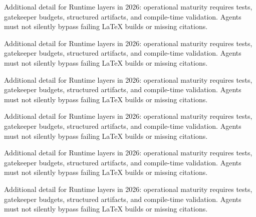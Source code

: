 Additional detail for Runtime layers in 2026: operational maturity requires tests, gatekeeper budgets, structured artifacts, and compile-time validation. Agents must not silently bypass failing LaTeX builds or missing citations. \cite{crewai2024} \cite{langgraph2024} \cite{mcp2024}

Additional detail for Runtime layers in 2026: operational maturity requires tests, gatekeeper budgets, structured artifacts, and compile-time validation. Agents must not silently bypass failing LaTeX builds or missing citations. \cite{crewai2024} \cite{langgraph2024} \cite{mcp2024}

Additional detail for Runtime layers in 2026: operational maturity requires tests, gatekeeper budgets, structured artifacts, and compile-time validation. Agents must not silently bypass failing LaTeX builds or missing citations. \cite{crewai2024} \cite{langgraph2024} \cite{mcp2024}

Additional detail for Runtime layers in 2026: operational maturity requires tests, gatekeeper budgets, structured artifacts, and compile-time validation. Agents must not silently bypass failing LaTeX builds or missing citations. \cite{crewai2024} \cite{langgraph2024} \cite{mcp2024}

Additional detail for Runtime layers in 2026: operational maturity requires tests, gatekeeper budgets, structured artifacts, and compile-time validation. Agents must not silently bypass failing LaTeX builds or missing citations. \cite{crewai2024} \cite{langgraph2024} \cite{mcp2024}

Additional detail for Runtime layers in 2026: operational maturity requires tests, gatekeeper budgets, structured artifacts, and compile-time validation. Agents must not silently bypass failing LaTeX builds or missing citations. \cite{crewai2024} \cite{langgraph2024} \cite{mcp2024}
